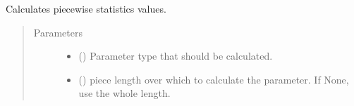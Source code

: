 \documentclass[letterpaper,10pt,english]{sphinxmanual}
\begin{document}
\begin{fulllineitems}
\begin{fulllineitems}
\label{\detokenize{generated/quality_assessment.tape_quality_information.TapeQualityInformation.calculate_statisitcs:quality_assessment.tape_quality_information.TapeQualityInformation.calculate_statisitcs}}
\sphinxAtStartPar
Calculates piecewise statistics values.
\begin{quote}\begin{description}
\item[{Parameters}] \leavevmode\begin{itemize}
\item {} 
\sphinxAtStartPar
{} ({\hyperref[\detokenize{generated/quality_assessment.data_types.TestType:quality_assessment.data_types.TestType}]{}}) \textendash{} Parameter type that should be calculated.

\item {} 
\sphinxAtStartPar
{} (\sphinxstyleliteralemphasis{\sphinxupquote{, }}) \textendash{} piece length over which to
calculate the parameter. If None, use the whole length.

\end{itemize}

\end{description}\end{quote}

\end{fulllineitems}


\end{fulllineitems}
\end{document}
